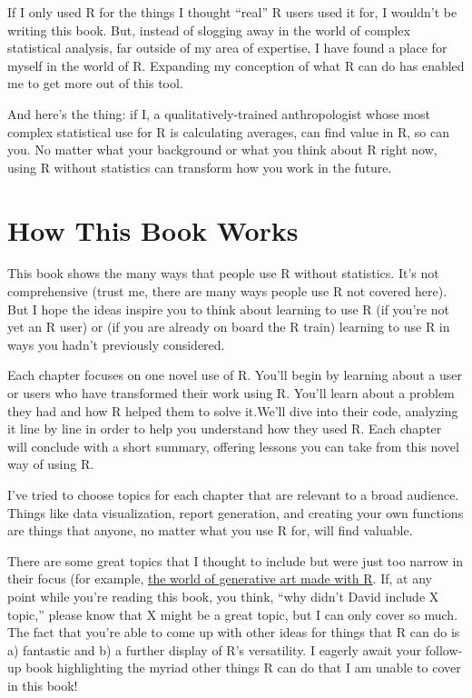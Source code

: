 \documentclass[
]{book}
\begin{document}
If I only used R for the things I thought ``real'' R users used it for, I wouldn't be writing this book. But, instead of slogging away in the world of complex statistical analysis, far outside of my area of expertise, I have found a place for myself in the world of R. Expanding my conception of what R can do has enabled me to get more out of this tool.

And here's the thing: if I, a qualitatively-trained anthropologist whose most complex statistical use for R is calculating averages, can find value in R, so can you. No matter what your background or what you think about R right now, using R without statistics can transform how you work in the future.

\hypertarget{how-this-book-works}{%
\section*{How This Book Works}\label{how-this-book-works}}

This book shows the many ways that people use R without statistics. It's not comprehensive (trust me, there are many ways people use R not covered here). But I hope the ideas inspire you to think about learning to use R (if you're not yet an R user) or (if you are already on board the R train) learning to use R in ways you hadn't previously considered.

Each chapter focuses on one novel use of R. You'll begin by learning about a user or users who have transformed their work using R. You'll learn about a problem they had and how R helped them to solve it.We'll dive into their code, analyzing it line by line in order to help you understand how they used R. Each chapter will conclude with a short summary, offering lessons you can take from this novel way of using R.

I've tried to choose topics for each chapter that are relevant to a broad audience. Things like data visualization, report generation, and creating your own functions are things that anyone, no matter what you use R for, will find valuable.

There are some great topics that I thought to include but were just too narrow in their focus (for example, \href{https://blog.djnavarro.net/posts/2021-10-19_rtistry-posts/}{the world of generative art made with R}. If, at any point while you're reading this book, you think, ``why didn't David include X topic,'' please know that X might be a great topic, but I can only cover so much. The fact that you're able to come up with other ideas for things that R can do is a) fantastic and b) a further display of R's versatility. I eagerly await your follow-up book highlighting the myriad other things R can do that I am unable to cover in this book!
\end{document}
